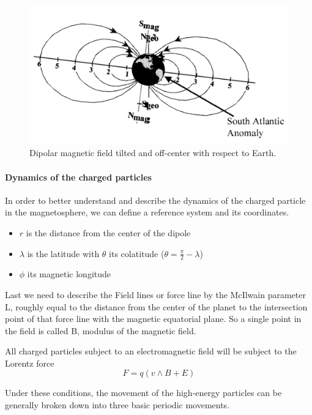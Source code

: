 \documentclass[./dissertation.tex]{subfiles}
\begin{document}
\begin{figure}[h!]
\centering
  \includegraphics[scale = 0.50]{imgs/radbelt1.png}
  \caption{Dipolar magnetic field tilted and off-center with respect to Earth. \cite{bib2}}
  \label{fig:radbel1}
\end{figure}

\paragraph{Dynamics of the charged particles}

In order to better understand and describe the dynamics of the charged particle in the magnetosphere, we can define a reference system and its coordinates. 
\begin{itemize}
    \item $r$ is the distance from the center of the dipole
    \item $\lambda$ is the latitude with $\theta$ its colatitude ($\theta = \frac{\pi}{2} - \lambda$)
    \item $\phi$ its magnetic longitude
\end{itemize}

Last we need to describe the Field lines or force line by the McIlwain parameter L, roughly equal to the distance from the center of the planet to the intersection point of that force line with the magnetic equatorial plane. So a single point in the field is called B, modulus of the magnetic field.

All charged particles subject to an electromagnetic field will be subject to the Lorentz force 
\begin{equation}
    F = q (v \wedge B + E )
\end{equation}

Under these conditions, the movement of the high-energy particles can be generally broken down into three basic periodic movements.
\end{document}
